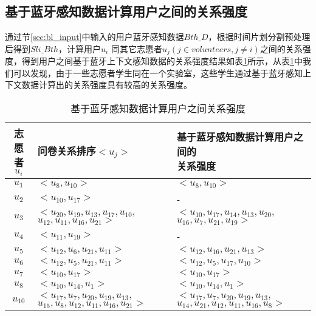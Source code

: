 \newpage
\subsection{基于蓝牙感知数据计算用户之间的关系强度}
通过节\ref{sec:bl_input}中输入的用户蓝牙感知数据$Bth\_D$，根据时间片划分割预处理后得到$Sli\_Bth$，计算用户$u_{i}$ 同其它志愿者$u_{j}(j \in volunteers, j \neq i)$之间的关系强度，得到用户之间基于蓝牙上下文感知数据的关系强度结果如表\ref{tab:result_bth}所示，从表\ref{tab:result_bth}中我们可以发现，由于一些志愿者学生同在一个实验室，这些学生通过基于蓝牙感知上下文数据计算出的关系强度具有较高的关系强度。
\begin{table}[htbp]
\wuhao
  \centering
  \caption[基于蓝牙感知数据计算用户之间关系强度]{基于蓝牙感知数据计算用户之间关系强度}
  \label{tab:result_bth}
    \begin{tabular}{cll}%
      \toprule[1.5pt]
      {志愿者\mbox{$u_{i}$}} & {问卷关系排序\mbox{$<u_{j}>$}} & \tabincell{c}{基于蓝牙感知数据计算用户之间的\\ 关系强度} \\
      \midrule[1pt]
      \mbox{$u_{1}$} & \mbox{$<u_{8},u_{10}>$} & \mbox{$<u_{8},u_{10}>$}  \\
      \hline
      \mbox{$u_{2}$} & \mbox{$<u_{10},u_{17}>$} & -  \\
      \hline
      \mbox{$u_{3} $}&\tabincell{c}{$ <u_{20},u_{19},u_{13},u_{17},u_{10},$\\ $u_{12},u_{11},u_{16},u_{21}>$} &\tabincell{c}{$ <u_{10},u_{17},u_{14},u_{13},u_{20},$\\ $u_{16},u_{7},u_{21},u_{19}>$}\\
      \hline
      \mbox{$u_{4}$} & \mbox{$<u_{11},u_{19}>$} & - \\
      \hline
      \mbox{$u_{5} $}& \mbox{$<u_{12},u_{6},u_{21},u_{11}>$} & \mbox{$<u_{12},u_{16},u_{21},u_{13}>$} \\
      \hline
      \mbox{$u_{6}$} & \mbox{$<u_{12},u_{5},u_{21},u_{11}>$} & \mbox{$<u_{12},u_{5},u_{17},u_{10}>$}\\
      \hline
      \mbox{$u_{7}$} & \mbox{$<u_{10},u_{17}>$} & \mbox{$<u_{10},u_{17}>$} \\
      \hline
      \mbox{$u_{8}$} &\mbox{$ <u_{10},u_{14},u_{1}>$} &\mbox{$ <u_{10},u_{14},u_{1}>$} \\
      \hline
      \mbox{$u_{10} $}& \tabincell{c}{$<u_{17},u_{7},u_{20},u_{19},u_{13},$\\ $u_{15},u_{8},u_{12},u_{11},u_{16},u_{21}>$} & \tabincell{c}{$<u_{17},u_{7},u_{20},u_{19},u_{13},$\\ $u_{14},u_{21},u_{12},u_{11},u_{16},u_{8}>$}\\

\end{tabular}
\end{table}
